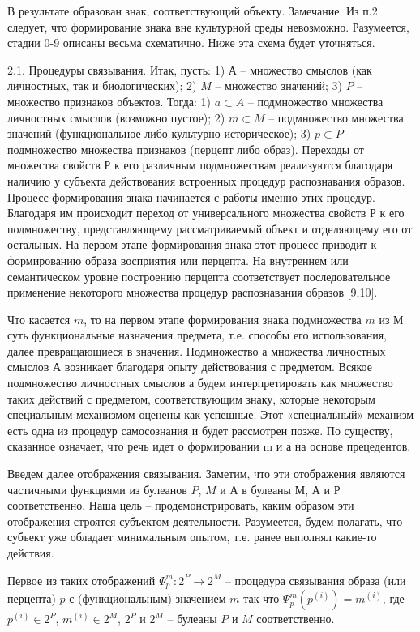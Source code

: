 В результате образован знак, соответствующий объекту.
Замечание. Из п.2 следует, что формирование знака вне культурной среды невозможно.
Разумеется, стадии 0-9 описаны весьма схематично. Ниже эта схема будет уточняться.

2.1. Процедуры связывания. Итак, пусть:
1) $А$ – множество смыслов (как личностных, так и биологических);
2) $M$ – множество значений;
3) $P$ – множество признаков объектов.
Тогда:
1) $a\subset A$ – подмножество множества личностных смыслов (возможно пустое);
2) $m\subset M$ – подмножество множества значений (функциональное либо культурно-историческое);
3) $p\subset P$ – подмножество множества признаков (перцепт либо образ).
Переходы от множества свойств Р к его различным подмножествам реализуются благодаря наличию у субъекта действования встроенных процедур распознавания образов.
Процесс формирования знака начинается с работы именно этих процедур. Благодаря им происходит переход от универсального множества свойств Р к его подмножеству, представляющему рассматриваемый объект и отделяющему его от остальных. На первом этапе формирования знака этот процесс приводит к формированию образа восприятия или перцепта. На внутреннем или семантическом уровне построению перцепта соответствует последовательное применение некоторого множества процедур распознавания образов [9,10].

Что касается $m$, то на первом этапе формирования знака подмножества $m$ из $М$ суть функциональные назначения предмета, т.е. способы его использования, далее превращающиеся в значения.
Подмножество $а$ множества личностных смыслов $А$ возникает благодаря опыту действования с предметом. Всякое подмножество личностных смыслов а будем интерпретировать как множество таких действий с предметом, соответствующим знаку, которые некоторым специальным механизмом оценены как успешные. Этот «специальный» механизм есть одна из процедур самосознания и будет рассмотрен позже.
По существу, сказанное означает, что речь идет о формировании m и а на основе прецедентов.

Введем далее отображения связывания. Заметим, что эти отображения являются частичными функциями из булеанов $P$, $M$ и $А$ в булеаны $М$, $А$ и $Р$ соответственно. Наша цель – продемонстрировать, каким образом эти отображения строятся субъектом деятельности. Разумеется, будем полагать, что субъект уже обладает минимальным опытом, т.е. ранее выполнял какие-то действия.

Первое из таких отображений $\Psi_p^m:2^P\rightarrow 2^M$ – процедура связывания образа (или перцепта) $p$ с (функциональным) значением $m$ так что $\Psi_p^m(p^{(i)})=m^{(i)}$, где $p^{(i)}\in 2^P$, $m^{(i)}\in 2^M$, $2^P$ и $2^M$ – булеаны $P$ и $M$ соответственно.

